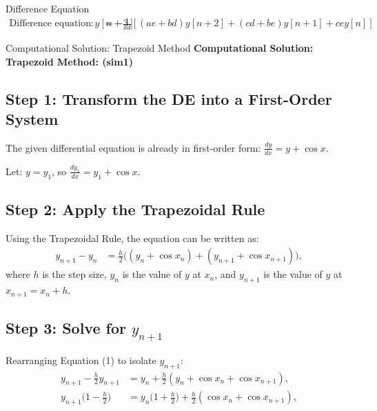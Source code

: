 \documentclass{beamer}
\begin{document}
	\begin{frame}{Difference Equation}
		\begin{align}
			\text{Difference equation: } 
			y[n+3] &= -\frac{1}{ad} \left[(ae+bd)y[n+2] + (cd+be)y[n+1] + cey[n]\right]
		\end{align}
	\end{frame}
	\begin{frame}{Computational Solution: Trapezoid Method}
		\textbf{Computational Solution: Trapezoid Method: (sim1)}
		
		\subsection*{Step 1: Transform the DE into a First-Order System}
		
		The given differential equation is already in first-order form:
		$\frac{dy}{dx} = y + \cos x$.
		
		Let:
		$y = y_1$, so $\frac{dy_1}{dx} = y_1 + \cos x$.
		
		\subsection*{Step 2: Apply the Trapezoidal Rule}
		
		Using the Trapezoidal Rule, the equation can be written as:
		\begin{align}
			y_{n+1} - y_n &= \frac{h}{2} \big( (y_n + \cos x_n) + (y_{n+1} + \cos x_{n+1}) \big),
		\end{align}
		where $h$ is the step size, $y_n$ is the value of $y$ at $x_n$, and $y_{n+1}$ is the value of $y$ at $x_{n+1} = x_n + h$.
		
		\subsection*{Step 3: Solve for $y_{n+1}$}
		
		Rearranging Equation (1) to isolate $y_{n+1}$:
		\begin{align}
			y_{n+1} - \frac{h}{2} y_{n+1} &= y_n + \frac{h}{2} (y_n + \cos x_n + \cos x_{n+1}), \\
			y_{n+1} \big( 1 - \frac{h}{2} \big) &= y_n \big( 1 + \frac{h}{2} \big) + \frac{h}{2} (\cos x_n + \cos x_{n+1}),
		\end{align}
	\end{frame}
\end{document}
